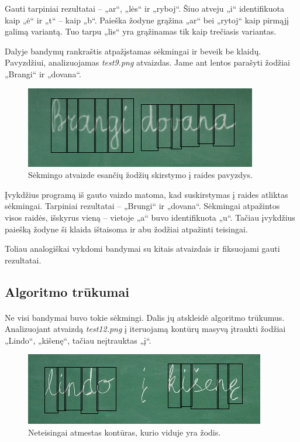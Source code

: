 \documentclass[a4paper,12pt]{article}
\begin{document}
Gauti tarpiniai rezultatai – „ar“, „lės“ ir „ryboj“. Šiuo atveju „i“ identifikuota kaip „ė“ ir „t“ – kaip „b“. Paieška žodyne grąžina „ar“ bei „rytoj“ kaip pirmąjį galimą variantą. Tuo tarpu „lis“ yra grąžinamas tik kaip trečiasis variantas.

Dalyje bandymų rankraštis atpažįstamas sėkmingai ir beveik be klaidų. Pavyzdžiui, analizuojamas \textit{test9.png} atvaizdas. Jame ant lentos parašyti žodžiai „Brangi“ ir „dovana“.
	\begin{figure}[H]
		\centering
		\includegraphics[scale=0.6]{images/test9}
		\caption{Sėkmingo atvaizde esančių žodžių skirstymo į raides pavyzdys.}   %
		\label{img:test9}
	\end{figure}

Įvykdžius programą iš gauto vaizdo matoma, kad suskirstymas į raides atliktas sėkmingai. Tarpiniai rezultatai – „Brungi“ ir „dovana“. Sėkmingai atpažintos visos raidės, išskyrus vieną – vietoje „a“ buvo identifikuota „u“. Tačiau įvykdžius paiešką žodyne ši klaida ištaisoma ir abu žodžiai atpažinti teisingai.

Toliau analogiškai vykdomi bandymai su kitais atvaizdais ir fiksuojami gauti rezultatai.

\subsection{Algoritmo trūkumai}
\paragraph{} Ne visi bandymai buvo tokie sėkmingi. Dalis jų atskleidė algoritmo trūkumus. Analizuojant atvaizdą \textit{test12.png} į iteruojamą kontūrų masyvą įtraukti žodžiai „Lindo“, „kišenę“, tačiau neįtrauktas „į“.
 	\begin{figure}[H]
 		\centering
 		\includegraphics[scale=0.6]{images/test12}
 		\caption{Neteisingai atmestas kontūras, kurio viduje yra žodis.}   %
 		\label{img:test12}
 	\end{figure}
\end{document}

